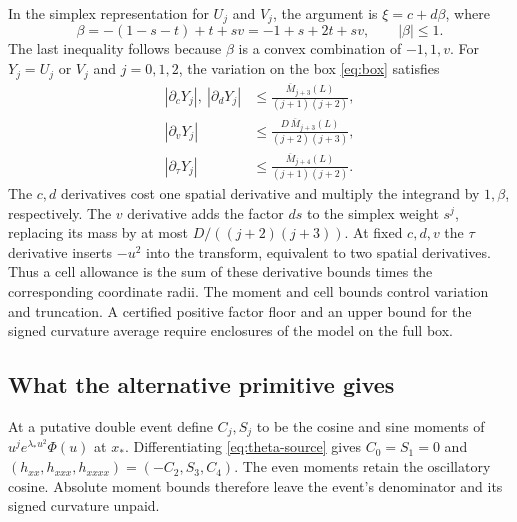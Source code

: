 In the simplex representation for \(U_j\) and \(V_j\), the argument
is \(\xi=c+d\beta\), where
\[
\beta=-(1-s-t)+t+sv=-1+s+2t+sv,\qquad |\beta|\le 1 .
\]
The last inequality follows because \(\beta\) is a convex combination
of \(-1,1,v\). For \(Y_j=U_j\) or \(V_j\) and \(j=0,1,2\), the
variation on the box \eqref{eq:box} satisfies
\begin{equation}\label{eq:theta-cell}
\begin{aligned}
|\partial_c Y_j|,\ |\partial_d Y_j|
    &\le \frac{\overline M_{j+3}(L)}{(j+1)(j+2)},\\
|\partial_v Y_j|
    &\le \frac{D\,\overline M_{j+3}(L)}{(j+2)(j+3)},\\
|\partial_\tau Y_j|
    &\le \frac{\overline M_{j+4}(L)}{(j+1)(j+2)} .
\end{aligned}
\end{equation}
The \(c,d\) derivatives cost one spatial derivative and multiply
the integrand by \(1,\beta\), respectively. The \(v\) derivative
adds the factor \(ds\) to the simplex weight \(s^j\), replacing its
mass by at most \(D/((j+2)(j+3))\). At fixed \(c,d,v\) the
\(\tau\) derivative inserts \(-u^2\) into the transform, equivalent
to two spatial derivatives. Thus a cell allowance is the sum of
these derivative bounds times the corresponding coordinate radii.
The moment and cell bounds control variation and truncation. A
certified positive factor floor and an upper bound for the signed
curvature average require enclosures of the model on the full box.

\subsection{What the alternative primitive gives}

At a putative double event define \(C_j,S_j\) to be the cosine and
sine moments of \(u^j e^{\lambda_*u^2}\Phi(u)\) at \(x_*\).
Differentiating \eqref{eq:theta-source} gives
\(C_0=S_1=0\) and
\((h_{xx},h_{xxx},h_{xxxx})=(-C_2,S_3,C_4)\). The even moments
retain the oscillatory cosine. Absolute moment bounds therefore
leave the event's denominator and its signed curvature unpaid.

